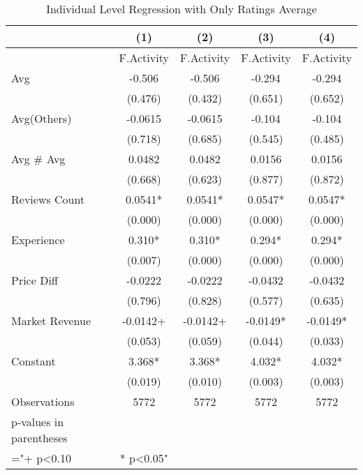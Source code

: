 \begin{table}
\centering
\begin{tabular}{@{}lcccc@{}}
\toprule
                        & (1)                 & (2)        & (3)        & (4)        \\ \midrule
                        & F.Activity          & F.Activity & F.Activity & F.Activity \\
Avg                     & -0.506              & -0.506     & -0.294     & -0.294     \\
                        & (0.476)             & (0.432)    & (0.651)    & (0.652)    \\
Avg(Others)             & -0.0615             & -0.0615    & -0.104     & -0.104     \\
                        & (0.718)             & (0.685)    & (0.545)    & (0.485)    \\
Avg \# Avg              & 0.0482              & 0.0482     & 0.0156     & 0.0156     \\
                        & (0.668)             & (0.623)    & (0.877)    & (0.872)    \\
Reviews Count           & 0.0541*             & 0.0541*    & 0.0547*    & 0.0547*    \\
                        & (0.000)             & (0.000)    & (0.000)    & (0.000)    \\
Experience              & 0.310*              & 0.310*     & 0.294*     & 0.294*     \\
                        & (0.007)             & (0.000)    & (0.000)    & (0.000)    \\
Price Diff              & -0.0222             & -0.0222    & -0.0432    & -0.0432    \\
                        & (0.796)             & (0.828)    & (0.577)    & (0.635)    \\
Market Revenue          & -0.0142+            & -0.0142+   & -0.0149*   & -0.0149*   \\
                        & (0.053)             & (0.059)    & (0.044)    & (0.033)    \\
Constant                & 3.368*              & 3.368*     & 4.032*     & 4.032*     \\
                        & (0.019)             & (0.010)    & (0.003)    & (0.003)    \\
Observations            & 5772                & 5772       & 5772       & 5772       \\
p-values in parentheses &                     &            &            &            \\
="+ p\textless{}0.10    & * p\textless{}0.05" &            &            &            \\ \bottomrule
\end{tabular}
\caption{Individual Level Regression with Only Ratings Average }
\label{reg_ind_0}
\end{table}